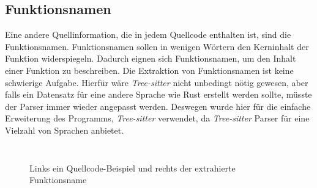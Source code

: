 \documentclass[12pt,letterpaper,ngerman]{article}
\begin{document}
\subsection{Funktionsnamen}
Eine andere Quellinformation, die in jedem Quellcode enthalten ist,
sind die Funktionsnamen. Funktionsnamen sollen in wenigen Wörtern 
den Kerninhalt der Funktion widerspiegeln. Dadurch eignen sich 
Funktionsnamen, um den Inhalt einer Funktion zu beschreiben. 
Die Extraktion von Funktionsnamen ist keine schwierige Aufgabe.
Hierfür wäre \textit{Tree-sitter} nicht unbedingt nötig gewesen, 
aber falls ein 
Datensatz für eine andere Sprache wie Rust erstellt werden sollte,
müsste der Parser immer wieder angepasst werden.
Deswegen wurde hier für die einfache Erweiterung des Programms,
\textit{Tree-sitter} verwendet, da \textit{Tree-sitter} Parser für 
eine Vielzahl von Sprachen anbietet.
%
\begin{figure}
  \begin{center}
    \begin{minipage}[c]{6cm}
        \centering
        \inputminted[fontsize=\scriptsize]{c}{comments.c}
    \end{minipage}
    \hspace{0.1cm}
    \begin{minipage}[c]{6cm}
        \centering
        \inputminted[fontsize=\scriptsize]{json}{names.json}
    \end{minipage}
  \end{center}
  \caption{Links ein Quellcode-Beispiel und rechts der extrahierte Funktionsname}
\end{figure}

\hfill\\
\pagebreak
\hfill\\
\end{document}
